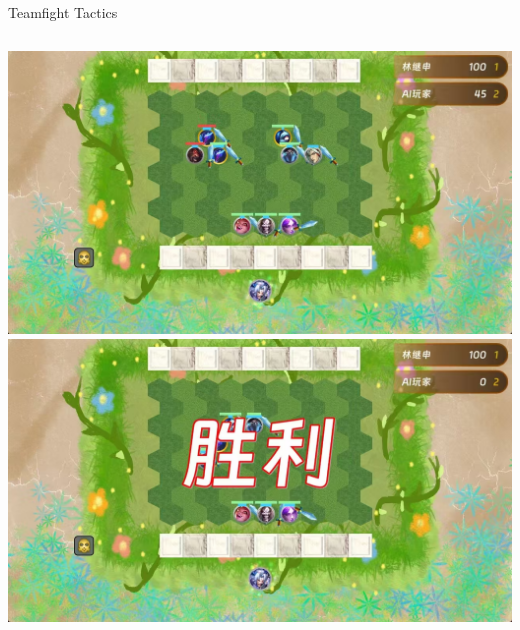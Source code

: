 \documentclass{beamer}
\begin{document}
\begin{frame}[fragile]{Teamfight Tactics}
\begin{columns}
\begin{column}{0.4\textwidth}
\includegraphics[width=\textwidth]
{figures/teamfight_tactics_5}
\includegraphics[width=\textwidth]
{figures/teamfight_tactics_6}
\end{column}
\end{columns}
\end{frame}
\end{document}
